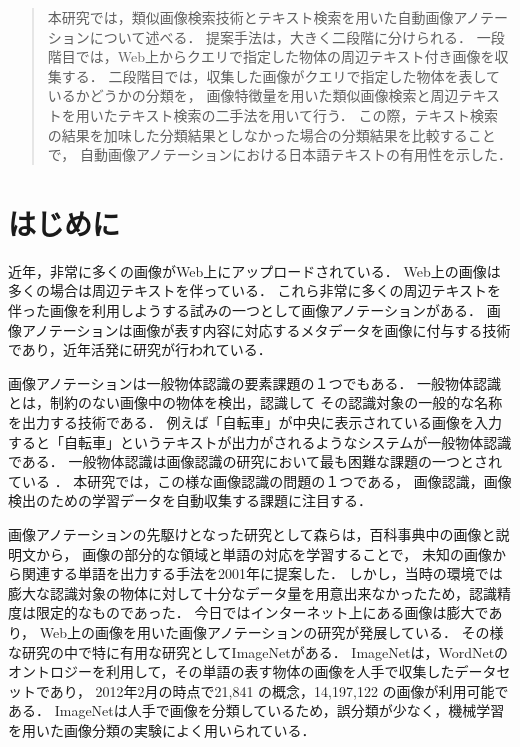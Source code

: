 
\begin{abstract}
本研究では，類似画像検索技術とテキスト検索を用いた自動画像アノテーションについて述べる．
提案手法は，大きく二段階に分けられる．
一段階目では，Web上からクエリで指定した物体の周辺テキスト付き画像を収集する．
二段階目では，収集した画像がクエリで指定した物体を表しているかどうかの分類を，
画像特徴量を用いた類似画像検索と周辺テキストを用いたテキスト検索の二手法を用いて行う．
この際，テキスト検索の結果を加味した分類結果としなかった場合の分類結果を比較することで，
自動画像アノテーションにおける日本語テキストの有用性を示した．
\end{abstract}



\chapter{はじめに}



近年，非常に多くの画像がWeb上にアップロードされている．
Web上の画像は多くの場合は周辺テキストを伴っている．
これら非常に多くの周辺テキストを伴った画像を利用しようする試みの一つとして画像アノテーションがある．
画像アノテーションは画像が表す内容に対応するメタデータを画像に付与する技術であり，近年活発に研究が行われている\cite{jeon,watanabe}．

画像アノテーションは一般物体認識の要素課題の１つでもある．
一般物体認識とは，制約のない画像中の物体を検出，認識して
その認識対象の一般的な名称を出力する技術である．
例えば「自転車」が中央に表示されている画像を入力すると「自転車」というテキストが出力がされるようなシステムが一般物体認識である．
一般物体認識は画像認識の研究において最も困難な課題の一つとされている\cite{yanai}
．
%
%
本研究では，この様な画像認識の問題の１つである，
画像認識，画像検出のための学習データを自動収集する課題に注目する．

画像アノテーションの先駆けとなった研究として森ら\cite{mori}は，百科事典中の画像と説明文から，
画像の部分的な領域と単語の対応を学習することで，
未知の画像から関連する単語を出力する手法を2001年に提案した．
しかし，当時の環境では膨大な認識対象の物体に対して十分なデータ量を用意出来なかったため，認識精度は限定的なものであった．
今日ではインターネット上にある画像は膨大であり，
Web上の画像を用いた画像アノテーションの研究が発展している．
その様な研究の中で特に有用な研究としてImageNet\cite{imagenet}がある．
ImageNet\cite{imagenet}は，WordNetのオントロジーを利用して，その単語の表す物体の画像を人手で収集したデータセットであり，
2012年2月の時点で21,841 の概念，14,197,122 の画像が利用可能である．
ImageNetは人手で画像を分類しているため，誤分類が少なく，機械学習を用いた画像分類の実験によく用いられている． 

